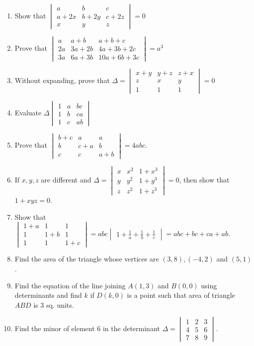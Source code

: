 \begin{enumerate}
\item Show that $\begin{vmatrix}a&b&c \\ a+2x&b+2y&c+2z \\ x&y&z \end{vmatrix} = 0$
\item Prove that $\begin{vmatrix}a&a+b&a+b+c \\ 2a&3a+2b&4a+3b+2c \\3a&6a+3b&10a+6b+3c \end{vmatrix}=a^3$
\item Without expanding, prove that $\Delta=\begin{vmatrix}x+y&y+z&z+x \\ z&x&y \\ 1&1&1 \end{vmatrix}=0$
\item Evaluate $\Delta \begin{vmatrix}1&a&bc \\1&b&ca \\1&c&ab \end{vmatrix}$
\item Prove that $\begin{vmatrix}b+c&a&a \\b&c+a&b \\c&c&a+b \end{vmatrix} = 4abc$.
\item If $x, y, z$ are different and $\Delta=\begin{vmatrix}x&x^2&1+x^3 \\y&y^2&1+y^3 \\z&z^2&1+z^3 \end{vmatrix} = 0$, then show that $1+xyz = 0$.
\item Show that $\begin{vmatrix} 1+a&1&1 \\ 1&1+b&1 \\ 1&1&1+c \end{vmatrix} = abc \begin{vmatrix}1+\frac{1}{a}+\frac{1}{b}+\frac{1}{c} \end{vmatrix}= abc+bc+ca+ab $.
\item Find the area of the triangle whose vertices are $(3,8), (-4,2)$ and $(5,1)$.
\item Find the equation of the line joining $A(1,3)$ and $B(0,0)$ using determinants and find  $k$ if $D(k,0)$ is a point such that area of triangle $ABD$ is $3$ sq. units.
\item Find the minor of element $6$ in the determinant $\Delta= \begin{vmatrix}1&2&3 \\4&5&6 \\7&8&9 \end{vmatrix}$.

\end{enumerate}

